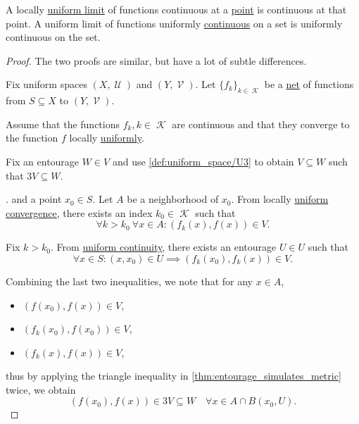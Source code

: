 \begin{proposition}\label{thm:uniform_limit_of_continuous_functions}
  \hfill
  \begin{thmenum}
     A locally \hyperref[def:function_net_convergence]{uniform limit} of functions continuous at a \hyperref[thm:uniform_space_local_continuity]{point} is continuous at that point.
     A uniform limit of functions uniformly \hyperref[def:uniform_continuity]{continuous} on a set is uniformly continuous on the set.
  \end{thmenum}
\end{proposition}
\begin{proof}
  The two proofs are similar, but have a lot of subtle differences.

  Fix uniform spaces \( (X, \mscrU) \) and \( (Y, \mscrV) \). Let \( \{ f_k \}_{k \in \mscrK} \) be a \hyperref[def:topological_net]{net} of functions from \( S \subseteq X \) to \( (Y, \mscrV) \).

   Assume that the functions \( f_k, k \in \mscrK \) are continuous and that they converge to the function \( f \) locally \hyperref[def:function_net_convergence/locally_uniform]{uniformly}.

  Fix an entourage \( W \in V \) and use \ref{def:uniform_space/U3} to obtain \( V \subseteq W \) such that \( 3V \subseteq W \).

  . and a point \( x_0 \in S \). Let \( A \) be a neighborhood of \( x_0 \). From locally \hyperref[def:function_net_convergence]{uniform convergence}, there exists an index \( k_0 \in \mscrK \) such that
  \begin{equation*}
    \forall k > k_0 \ \forall x \in A : (f_k(x), f(x)) \in V.
  \end{equation*}

  Fix \( k > k_0 \). From \hyperref[def:function_net_convergence/locally_uniform]{uniform continuity}, there exists an entourage \( U \in U \) such that
  \begin{equation*}
    \forall x \in S : (x, x_0) \in U \implies (f_k(x_0), f_k(x)) \in V.
  \end{equation*}

  Combining the last two inequalities, we note that for any \( x \in A \),
  \begin{itemize}
    \item \( (f(x_0), f(x)) \in V \),
    \item \( (f_k(x_0), f(x_0)) \in V \),
    \item \( (f_k(x), f(x)) \in V \),
  \end{itemize}
  thus by applying the triangle inequality in \cref{thm:entourage_simulates_metric} twice, we obtain
  \begin{equation*}
    (f(x_0), f(x)) \in 3V \subseteq W \quad\forall x \in A \cap B(x_0, U).
  \end{equation*}


\end{proof}
